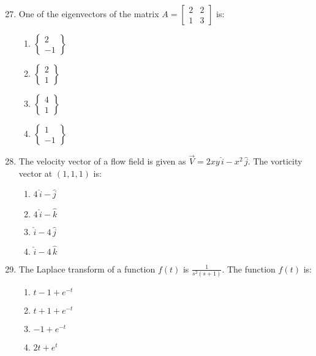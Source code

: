 \documentclass[journal,9pt,onecolumn]{IEEEtran}
\begin{document}
\begin{enumerate}

\setcounter{enumi}{26}
\item One of the eigenvectors of the matrix $A = \begin{bmatrix} 2 & 2 \\ 1 & 3 \end{bmatrix}$ is:

\begin{multicols}{4}    
\begin{enumerate}
    \item $ \left\{\begin{array}{c}2 \\ -1 \end{array}\right\}$
    \item $ \left\{\begin{array}{c}2 \\ 1 \end{array}\right\}$
    \item $ \left\{\begin{array}{c}4 \\ 1 \end{array}\right\}$
    \item $ \left\{\begin{array}{c}1 \\ -1 \end{array}\right\}$
\end{enumerate}
\end{multicols}

\item The velocity vector of a flow field is given as $ \vec{V} = 2xy \, \hat{i} - x^2 \, \hat{j} $. The vorticity vector at $(1, 1, 1)$ is:
\begin{multicols}{4}
\begin{enumerate}
    \item $ 4 \, \hat{i} - \hat{j} $
    \item $ 4 \, \hat{i} - \hat{k} $
    \item $ \hat{i} - 4 \, \hat{j} $
    \item $ \hat{i} - 4 \, \hat{k} $
\end{enumerate}
\end{multicols}


\item  The Laplace transform of a function $f(t)$ is $\frac{1}{s^2(s+1)}$. The function $f(t)$ is:
\begin{multicols}{4}    
\begin{enumerate}
    \item $ t-1 + e^{-t} $
    \item $ t +1+ e^{-t} $
    \item $ -1 + e^{-t} $
    \item $ 2t + e^{t} $
\end{enumerate}
\end{multicols}



\end{enumerate}
\end{document}
